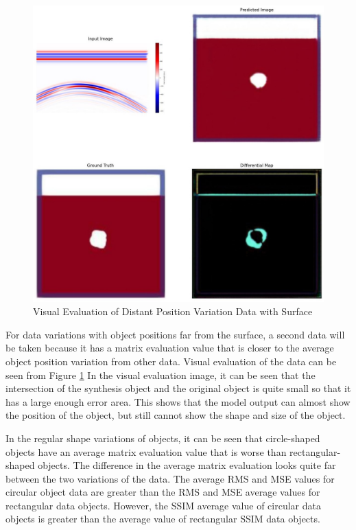 \documentclass[conference]{IEEEtran}
\begin{document}
\begin{figure}[ht]
  \centering
  \includegraphics[scale=0.15]{gambar/diffMapDalam.jpg}
  \caption{Visual Evaluation of Distant Position Variation Data with Surface}
  \label{fig:diffmapdalam}
\end{figure}

For data variations with object positions far from the surface, a second data will be taken because it has a matrix evaluation value that is closer to the average object position variation from other data.
Visual evaluation of the data can be seen from Figure \ref{fig:diffmapdalam}
In the visual evaluation image, it can be seen that the intersection of the synthesis object and the original object is quite small so that it has a large enough error area.
This shows that the model output can almost show the position of the object, but still cannot show the shape and size of the object.

In the regular shape variations of objects, it can be seen that circle-shaped objects have an average matrix evaluation value that is worse than rectangular-shaped objects.
The difference in the average matrix evaluation looks quite far between the two variations of the data.
The average RMS and MSE values for circular object data are greater than the RMS and MSE average values for rectangular data objects.
However, the SSIM average value of circular data objects is greater than the average value of rectangular SSIM data objects.
\end{document}
